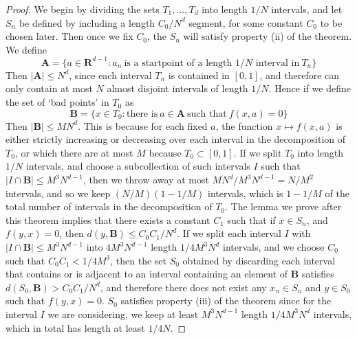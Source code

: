 \documentclass{report}
\theoremstyle{plain}
\theoremstyle{plain}
\begin{document}
\begin{proof}
    We begin by dividing the sets $T_1, \dots, T_d$ into length $1/N$ intervals, and let $S_n$ be defined by including a length $C_0/N^d$ segment, for some constant $C_0$ to be chosen later. Then once we fix $C_0$, the $S_n$ will satisfy property (ii) of the theorem. We define
    \[ \mathbf{A} = \{ a \in \mathbf{R}^{d-1} : a_n\ \text{is a startpoint of a length $1/N$ interval in}\ T_n \} \]
    Then $|\mathbf{A}| \leq N^d$, since each interval $T_n$ is contained in $[0,1]$, and therefore can only contain at most $N$ almost disjoint intervals of length $1/N$. Hence if we define the set of `bad points' in $T_0$ as
    \[ \mathbf{B} = \{ x \in T_0: \text{there is}\ a \in \mathbf{A}\ \text{such that}\ f(x,a) = 0 \} \]
    Then $|\mathbf{B}| \leq MN^d$. This is because for each fixed $a$, the function $x \mapsto f(x,a)$ is either strictly increasing or decreasing over each interval in the decomposition of $T_0$, or which there are at most $M$ because $T_0 \subset [0,1]$. If we split $T_0$ into length $1/N$ intervals, and choose a subcollection of such intervals $I$ such that $|I \cap \mathbf{B}| \leq M^3N^{d-1}$, then we throw away at most $MN^d/M^3N^{d-1} = N/M^2$ intervals, and so we keep $(N/M)(1 - 1/M)$ intervals, which is $1 - 1/M$ of the total number of intervals in the decomposition of $T_0$. The lemma we prove after this theorem implies that there exists a constant $C_1$ such that if $x \in S_n$, and $f(y,x) = 0$, then $d(y,\mathbf{B}) \leq C_0C_1/N^d$. If we split each interval $I$ with $|I \cap \mathbf{B}| \leq M^3N^{d-1}$ into $4M^3N^{d-1}$ length $1/4M^3N^d$ intervals, and we choose $C_0$ such that $C_0C_1 < 1/4M^3$, then the set $S_0$ obtained by discarding each interval that contains or is adjacent to an interval containing an element of $\mathbf{B}$ satisfies $d(S_0,\mathbf{B}) > C_0C_1/N^d$, and therefore there does not exist any $x_n \in S_n$ and $y \in S_0$ such that $f(y,x) = 0$. $S_0$ satisfies property (iii) of the theorem since for the interval $I$ we are considering, we keep at least $M^3N^{d-1}$ length $1/4M^3N^d$ intervals, which in total has length at least $1/4N$.
\end{proof}
\end{document}
